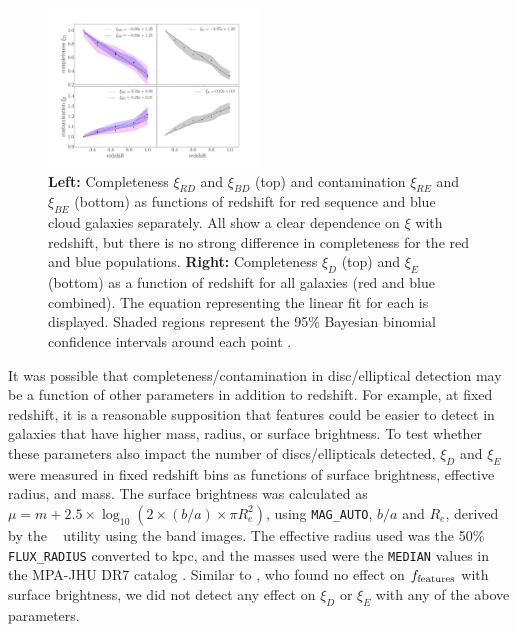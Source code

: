 \documentclass[useAMS,usenatbib]{mn2e}
\begin{document}
\begin{figure}
\centering
\includegraphics[width=0.5\textwidth,trim={3cm 1.5cm 3cm 3cm},clip]{figures/completeness_full.pdf}
\caption{\textbf{Left:} Completeness $\xi_{RD}$ and $\xi_{BD}$ (top) and contamination $\xi_{RE}$ and $\xi_{BE}$ (bottom) as functions of redshift for red sequence and blue cloud  galaxies separately. All show a clear dependence on $\xi$ with redshift, but there is no strong difference in completeness for the red and blue populations. \textbf{Right:} Completeness $\xi_D$ (top) and $\xi_E$ (bottom) as a function of redshift for all   galaxies (red and blue combined). The equation representing the linear fit for each is displayed. Shaded regions represent the 95\% Bayesian binomial confidence intervals around each point \citep{Cameron2013}. }
\label{fig:xi}
\end{figure}


It was possible that completeness/contamination in disc/elliptical detection may be a function of other parameters in addition to redshift. For example, at fixed redshift, it is a reasonable supposition that features could be easier to detect in galaxies that have higher mass, radius, or surface brightness. To test whether these parameters also impact the number of discs/ellipticals detected, $\xi_D$ and $\xi_E$ were measured in fixed redshift bins as functions of surface brightness, effective radius, and mass. The surface brightness was calculated as $\mu = m + 2.5 \times \log_{10}{(2 \times (b/a) \times \pi R_e^2 )}$, using {\tt MAG\_AUTO}, $b/a$ and $R_{e}$, derived by the \sextractor{}~\citep{Bertin1996} utility using the \Iband{} band images. The effective radius used was the 50\% {\tt FLUX\_RADIUS} converted to kpc, and the masses used were the {\tt MEDIAN} values in the MPA-JHU DR7 catalog \citep{Kauffmann2003b}. Similar to \citet{Willett2017}, who found no effect on $f_{\rm features}$ with surface brightness, we did not detect any effect on $\xi_D$ or $\xi_E$ with any of the above parameters. 
\end{document}

